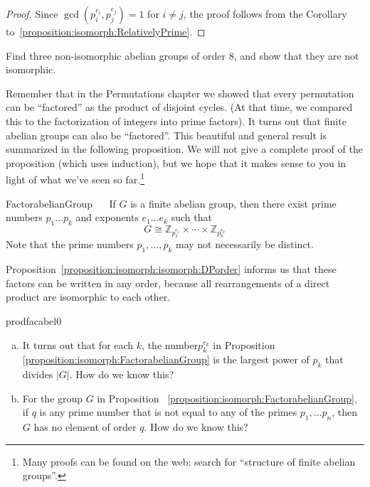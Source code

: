  
\begin{proof}
Since  $\gcd(p_i^{e_i},p_j^{e_j}) = 1$ for $i \neq j$, the proof follows from the Corollary to~\ref{proposition:isomorph:RelativelyPrime}.
\end{proof}

\begin{exercise}{}
Find three non-isomorphic abelian groups of order 8, and show that they are not isomorphic.
\end{exercise}


Remember that in the Permutations chapter we showed that every permutation can be ``factored''  as the product of disjoint cycles. (At that time, we compared this to the factorization of integers into prime factors).  It turns out that finite abelian groups can also be ``factored''.  This beautiful and general result is summarized in the following proposition. We will not give a complete proof of the proposition (which uses induction), but we hope that it makes sense to you in light of what we've seen so far.\footnote{Many proofs can be found on the web: search for ``structure of finite abelian groups''.}

\begin{prop}{FactorabelianGroup} ~~
If $G$ is a finite abelian group, then there exist prime numbers $p_1 \ldots p_k$ and exponents $e_1 \ldots e_k$ such that
\[
G \cong {\mathbb Z}_{p_1^{e_1}} \times \cdots \times {\mathbb
Z}_{p_k^{e_k}}
\]
Note that the prime numbers $p_1, \ldots, p_k$  may not necessarily be distinct.
\end{prop}

\begin{rem}  Proposition~\ref{proposition:isomorph:isomorph:DPorder} informs us that these factors can be written in any order, because all rearrangements of a direct product are isomorphic to each other.
\end{rem}


\begin{exercise}{prodfacabel0}
\begin{enumerate}[(a)]
\item
It turns out that for each $k$, the number$ p_k^{e_k}$  in Proposition~ \ref{proposition:isomorph:FactorabelianGroup}  is the largest power of $p_k$ that divides $|G|$.  How do we know this?
\item
For the group $G$ in Proposition~ \ref{proposition:isomorph:FactorabelianGroup}, if $q$ is any prime number that is not equal to any of the primes $p_1, \ldots p_n$, then $G$ has no element of order $q$.  How do we know this?
\end{enumerate}
\end{exercise}

